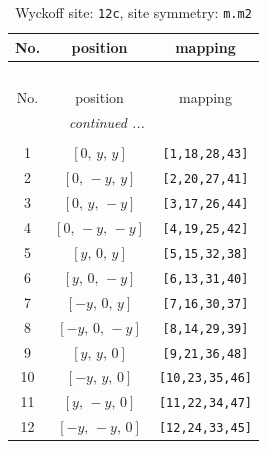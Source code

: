\documentclass[fleqn,8pt]{jsarticle}
\begin{document}
\begin{longtable}{ccc}
\caption{Wyckoff site: {\tt 12c}, site symmetry: {\tt m.m2}}
 \\
 \hline \hline
No. & position & mapping \\ \hline \endfirsthead

\multicolumn{2}{l}{\tablename\ \thetable{}} \\
 \hline \hline
No. & position & mapping \\ \hline \endhead

 \hline \hline
\multicolumn{2}{r}{\footnotesize\it continued ...} \\ \endfoot

 \hline \hline
\multicolumn{2}{r}{} \\ \endlastfoot

1 & $\left[ 0,\, y,\, y \right]$ & {\tt [1,18,28,43]} \\ \hline
2 & $\left[ 0,\, - y,\, y \right]$ & {\tt [2,20,27,41]} \\ \hline
3 & $\left[ 0,\, y,\, - y \right]$ & {\tt [3,17,26,44]} \\ \hline
4 & $\left[ 0,\, - y,\, - y \right]$ & {\tt [4,19,25,42]} \\ \hline
5 & $\left[ y,\, 0,\, y \right]$ & {\tt [5,15,32,38]} \\ \hline
6 & $\left[ y,\, 0,\, - y \right]$ & {\tt [6,13,31,40]} \\ \hline
7 & $\left[ - y,\, 0,\, y \right]$ & {\tt [7,16,30,37]} \\ \hline
8 & $\left[ - y,\, 0,\, - y \right]$ & {\tt [8,14,29,39]} \\ \hline
9 & $\left[ y,\, y,\, 0 \right]$ & {\tt [9,21,36,48]} \\ \hline
10 & $\left[ - y,\, y,\, 0 \right]$ & {\tt [10,23,35,46]} \\ \hline
11 & $\left[ y,\, - y,\, 0 \right]$ & {\tt [11,22,34,47]} \\ \hline
12 & $\left[ - y,\, - y,\, 0 \right]$ & {\tt [12,24,33,45]} \\
\end{longtable}
\renewcommand{\arraystretch}{1.2}
\end{document}
